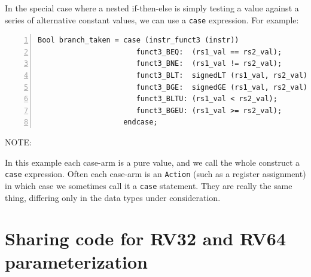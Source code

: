 \label{BSV_case_expressions}


In the special case where a nested if-then-else is simply testing a
value against a series of alternative constant values, we can use a
\verb|case| expression.  For example:

{\footnotesize
\begin{Verbatim}[frame=single, numbers=left, label=from src\_Common/Fn\_EX\_Control.bsv]
Bool branch_taken = case (instr_funct3 (instr))
                       funct3_BEQ:  (rs1_val == rs2_val);
                       funct3_BNE:  (rs1_val != rs2_val);
                       funct3_BLT:  signedLT (rs1_val, rs2_val);
                       funct3_BGE:  signedGE (rs1_val, rs2_val);
                       funct3_BLTU: (rs1_val < rs2_val);
                       funct3_BGEU: (rs1_val >= rs2_val);
                    endcase;
\end{Verbatim}
}


\vspace{1ex}

NOTE: 

\vspace{1ex}


In this example each case-arm is a pure value, and we call the whole
construct a \verb|case| expression.  Often each case-arm is an
\verb|Action| (such as a register assignment) in which case we
sometimes call it a \verb|case| statement.  They are really the same
thing, differing only in the data types under consideration.




\section{Sharing code for RV32 and RV64 {\via} parameterization}

